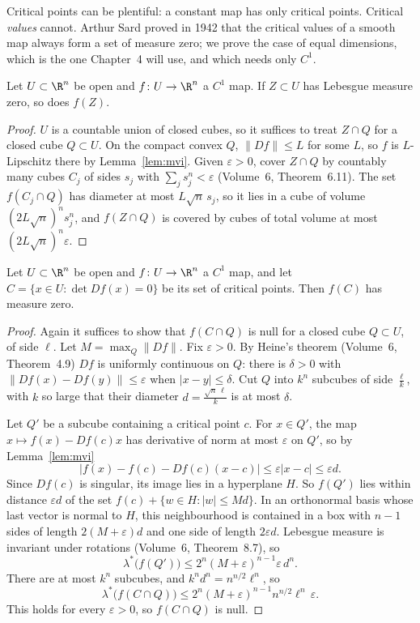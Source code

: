 Critical points can be plentiful: a constant map has only critical points. Critical \emph{values} cannot. Arthur Sard proved in 1942 that the critical
values of a smooth map always form a set of measure zero; we prove the case of equal dimensions, which is the one Chapter~4 will use, and which needs
only $C^1$.

\begin{lemma}\label{lem:nullsets}
Let $U\subset\R^n$ be open and $f\colon U\to\R^n$ a $C^1$ map. If $Z\subset U$ has Lebesgue measure zero, so does $f(Z)$.
\end{lemma}
\begin{proof}
$U$ is a countable union of closed cubes, so it suffices to treat $Z\cap Q$ for a closed cube $Q\subset U$. On the compact convex $Q$, $\|Df\|\le L$ for
some $L$, so $f$ is $L$-Lipschitz there by Lemma~\ref{lem:mvi}. Given $\varepsilon>0$, cover $Z\cap Q$ by countably many cubes $C_j$ of sides $s_j$ with
$\sum_js_j^n<\varepsilon$ (Volume~6, Theorem~6.11). The set $f(C_j\cap Q)$ has diameter at most $L\sqrt n\,s_j$, so it lies in a cube of volume
$(2L\sqrt n)^ns_j^n$, and $f(Z\cap Q)$ is covered by cubes of total volume at most $(2L\sqrt n)^n\varepsilon$.
\end{proof}

\begin{theorem}\label{thm:sard}
Let $U\subset\R^n$ be open and $f\colon U\to\R^n$ a $C^1$ map, and let $C=\{x\in U:\det Df(x)=0\}$ be its set of critical points. Then $f(C)$ has
measure zero.
\end{theorem}
\begin{proof}
Again it suffices to show that $f(C\cap Q)$ is null for a closed cube $Q\subset U$, of side $\ell$. Let $M=\max_Q\|Df\|$. Fix $\varepsilon>0$. By Heine's
theorem (Volume~6, Theorem~4.9) $Df$ is uniformly continuous on $Q$: there is $\delta>0$ with $\|Df(x)-Df(y)\|\le\varepsilon$ when $|x-y|\le\delta$. Cut
$Q$ into $k^n$ subcubes of side $\frac\ell k$, with $k$ so large that their diameter $d=\frac{\sqrt n\,\ell}k$ is at most $\delta$.

Let $Q'$ be a subcube containing a critical point $c$. For $x\in Q'$, the map $x\mapsto f(x)-Df(c)x$ has derivative of norm at most $\varepsilon$ on
$Q'$, so by Lemma~\ref{lem:mvi}
\[
\bigl|f(x)-f(c)-Df(c)(x-c)\bigr|\le\varepsilon|x-c|\le\varepsilon d.
\]
Since $Df(c)$ is singular, its image lies in a hyperplane $H$. So $f(Q')$ lies within distance $\varepsilon d$ of the set $f(c)+\{w\in H:|w|\le Md\}$. In an
orthonormal basis whose last vector is normal to $H$, this neighbourhood is contained in a box with $n-1$ sides of length $2(M+\varepsilon)d$ and one side
of length $2\varepsilon d$. Lebesgue measure is invariant under rotations (Volume~6, Theorem~8.7), so
\[
\lambda^*\bigl(f(Q')\bigr)\le2^n(M+\varepsilon)^{n-1}\varepsilon\,d^n.
\]
There are at most $k^n$ subcubes, and $k^nd^n=n^{n/2}\ell^n$, so
\[
\lambda^*\bigl(f(C\cap Q)\bigr)\le2^n(M+\varepsilon)^{n-1}n^{n/2}\ell^n\,\varepsilon.
\]
This holds for every $\varepsilon>0$, so $f(C\cap Q)$ is null.
\end{proof}

